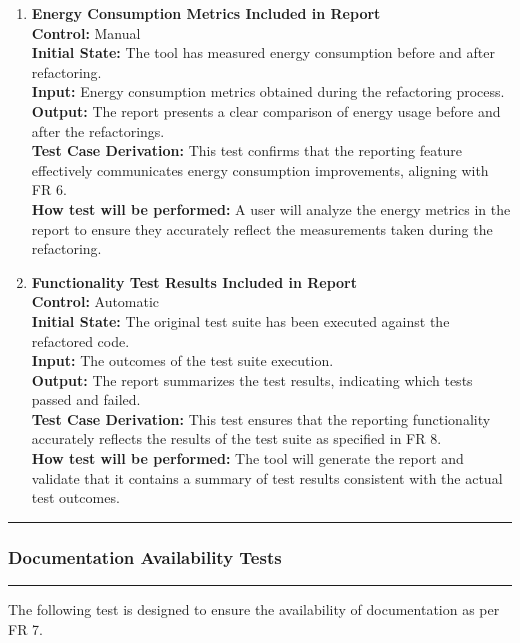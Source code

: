 \documentclass[12pt, titlepage]{article}
\newcommand{\colorrule}{\textcolor{BlueViolet}{\rule{\linewidth}{2pt}}}
\begin{document}
\begin{enumerate}[label={\bf
    \textcolor{Maroon}{test-FR-RP-\arabic*}}, wide=0pt, font=\itshape]
  \item \textbf{Energy Consumption Metrics Included in Report}\\[2mm]
    \textbf{Control:} Manual\\
    \textbf{Initial State:} The tool has measured energy consumption
    before and after refactoring.\\
    \textbf{Input:} Energy consumption metrics obtained during the
    refactoring process.\\
    \textbf{Output:} The report presents a clear comparison of energy
    usage before and after the refactorings.\\[2mm]
    \textbf{Test Case Derivation:} This test confirms that the
    reporting feature effectively communicates energy consumption
    improvements, aligning with FR 6.\\[2mm]
    \textbf{How test will be performed:} A user will analyze the
    energy metrics in the report to ensure they accurately reflect
    the measurements taken during the refactoring.

  \item \textbf{Functionality Test Results Included in Report}\\[2mm]
    \textbf{Control:} Automatic \\
    \textbf{Initial State:} The original test suite has been executed
    against the refactored code.\\
    \textbf{Input:} The outcomes of the test suite execution.\\
    \textbf{Output:} The report summarizes the test results,
    indicating which tests passed and failed.\\[2mm]
    \textbf{Test Case Derivation:} This test ensures that the
    reporting functionality accurately reflects the results of the
    test suite as specified in FR 8.\\[2mm]
    \textbf{How test will be performed:} The tool will generate the
    report and validate that it contains a summary of test results
    consistent with the actual test outcomes.
\end{enumerate}

\noindent
\colorrule

\subsubsection{Documentation Availability Tests}
\colorrule

\medskip

\noindent
The following test is designed to ensure the availability of
documentation as per FR 7.
\end{document}
